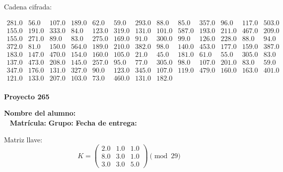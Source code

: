 \documentclass[12pt]{article}
\begin{document}
Cadena cifrada:
\begin{center}
$\begin{array}{lllllllllllll}
281.0 & 56.0 & 107.0 & 189.0 & 62.0 & 59.0 & 293.0 & 88.0 & 85.0 & 357.0 & 96.0 & 117.0 & 503.0\\
155.0 & 191.0 & 333.0 & 84.0 & 123.0 & 319.0 & 131.0 & 101.0 & 587.0 & 193.0 & 211.0 & 467.0 & 209.0\\
155.0 & 271.0 & 89.0 & 83.0 & 275.0 & 169.0 & 91.0 & 300.0 & 99.0 & 126.0 & 228.0 & 88.0 & 94.0\\
372.0 & 81.0 & 150.0 & 564.0 & 189.0 & 210.0 & 382.0 & 98.0 & 140.0 & 453.0 & 177.0 & 159.0 & 387.0\\
183.0 & 147.0 & 470.0 & 154.0 & 160.0 & 105.0 & 21.0 & 45.0 & 181.0 & 61.0 & 55.0 & 305.0 & 83.0\\
137.0 & 473.0 & 208.0 & 145.0 & 257.0 & 95.0 & 77.0 & 305.0 & 98.0 & 107.0 & 201.0 & 83.0 & 59.0\\
347.0 & 176.0 & 131.0 & 327.0 & 90.0 & 123.0 & 345.0 & 107.0 & 119.0 & 479.0 & 160.0 & 163.0 & 401.0\\
121.0 & 133.0 & 207.0 & 103.0 & 73.0 & 460.0 & 131.0 & 182.0\\
\end{array}$
\end{center}

\newpage


\textbf{Proyecto 265}

\textbf{Nombre del alumno:} \underline{\hspace{13cm}}\\\
\vspace{1cm}
\textbf{Matrícula:} \underline{\hspace{4cm}} \hspace{1cm}
\textbf{Grupo:} \underline{\hspace{2cm}}
\textbf{Fecha de entrega:} \underline{\hspace{2cm}}

\medskip

Matriz llave:
\[
K = \begin{pmatrix}
2.0 & 1.0 & 1.0\\
8.0 & 3.0 & 1.0\\
3.0 & 3.0 & 5.0
\end{pmatrix} \pmod{29}
\]
\end{document}

